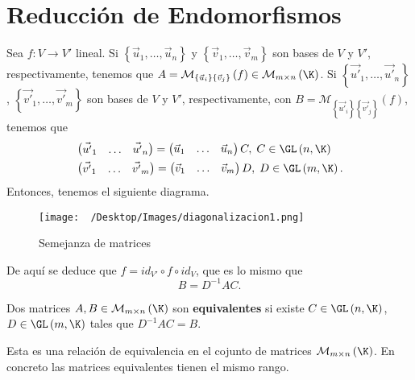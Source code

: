 \chapter{Reducción de Endomorfismos}
Sea $\displaystyle f : V \to V' $ lineal. Si $\displaystyle \left\{ \vec{u}_{1}, \ldots, \vec{u}_{n}\right\}  $ y $\displaystyle \left\{ \vec{v}_{1}, \ldots, \vec{v}_{m}\right\}  $ son bases de $\displaystyle V $ y $\displaystyle V' $, respectivamente, tenemos que $\displaystyle A =\mathcal{M}_{ \left\{ \vec{u}_{i}\right\} \left\{ \vec{v}_{j}\right\} }\left(f\right) \in \mathcal{M}_{m \times n} \left(\K\right) $. Si $\displaystyle \left\{ \vec{u'}_{1}, \ldots, \vec{u'}_{n}\right\}  $, $\displaystyle \left\{ \vec{v'}_{1}, \ldots, \vec{v'}_{m}\right\}  $ son bases de $\displaystyle V $ y $\displaystyle V' $, respectivamente, con $\displaystyle B =\mathcal{M}_{ \left\{ \vec{u'}_{i}\right\} \left\{ \vec{v'}_{j}\right\} }\left(f\right) $, tenemos que
\[
\begin{split}
	& \begin{pmatrix} \vec{u'}_{1} & \ldots & \vec{u'}_{n} \end{pmatrix} = \begin{pmatrix} \vec{u}_{1} & \ldots & \vec{u}_{n} \end{pmatrix} C, \; C \in \GL\left(n, \K\right) \\
	& \begin{pmatrix} \vec{v'}_{1} & \ldots & \vec{v'}_{m} \end{pmatrix} = \begin{pmatrix} \vec{v}_{1} & \ldots & \vec{v}_{m} \end{pmatrix} D, \; D \in \GL\left(m, \K\right).
\end{split}
\]
Entonces, tenemos el siguiente diagrama. 
\begin{figure}
\centering
\texttt{[image: ~/Desktop/Images/diagonalizacion1.png]}
\caption{Semejanza de matrices}
\label{ }
\end{figure}
De aquí se deduce que $\displaystyle f = id _{V'} \circ f \circ id _{V} $, que es lo mismo que
\[B = D^{-1}AC .\]
\begin{fdefinition}[]
	\normalfont Dos matrices $\displaystyle A,B \in \mathcal{M}_{m \times n}\left(\K\right) $ son \textbf{equivalentes} si existe $\displaystyle C \in \GL\left(n, \K\right) $, $\displaystyle D \in \GL\left(m, \K\right) $ tales que $\displaystyle D^{-1}AC = B $.
\end{fdefinition}

\begin{observation}
\normalfont Esta es una relación de equivalencia en el cojunto de matrices $\displaystyle \mathcal{M}_{m \times n}\left(\K\right) $. En concreto las matrices equivalentes tienen el mismo rango.
\end{observation}

